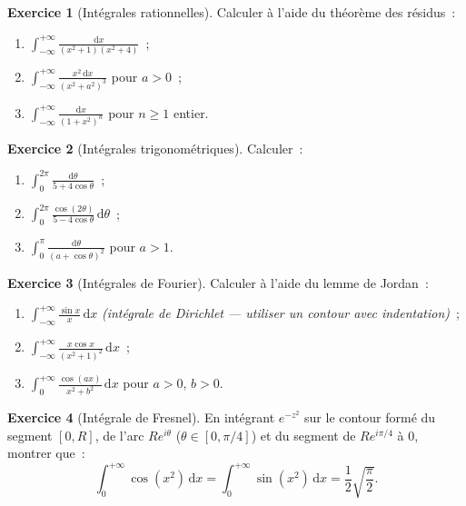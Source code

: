 \documentclass[12pt,a4paper,openany]{book}
\theoremstyle{definition}
\newtheorem{exercice}{Exercice}[chapter]
\theoremstyle{plain}
\theoremstyle{remark}
\newcommand{\dd}{\mathrm{d}}
\begin{document}
\begin{exercice}[Intégrales rationnelles]\label{exo:int-rationnelles}
Calculer à l'aide du théorème des résidus~:
\begin{enumerate}[label=\alph*)]
  \item $\displaystyle \int_{-\infty}^{+\infty} \frac{\dd x}{(x^2+1)(x^2+4)}$~;
  \item $\displaystyle \int_{-\infty}^{+\infty} \frac{x^2\,\dd x}{(x^2+a^2)^3}$
    pour $a > 0$~;
  \item $\displaystyle \int_{-\infty}^{+\infty} \frac{\dd x}{(1+x^2)^n}$
    pour $n \geq 1$ entier.
\end{enumerate}
\end{exercice}

\begin{exercice}[Intégrales trigonométriques]\label{exo:int-trig}
Calculer~:
\begin{enumerate}[label=\alph*)]
  \item $\displaystyle \int_0^{2\pi} \frac{\dd\theta}{5 + 4\cos\theta}$~;
  \item $\displaystyle \int_0^{2\pi} \frac{\cos(2\theta)}{5 - 4\cos\theta}\, \dd\theta$~;
  \item $\displaystyle \int_0^{\pi} \frac{\dd\theta}{(a + \cos\theta)^2}$ pour $a > 1$.
\end{enumerate}
\end{exercice}

\begin{exercice}[Intégrales de Fourier]\label{exo:int-fourier}
Calculer à l'aide du lemme de Jordan~:
\begin{enumerate}[label=\alph*)]
  \item $\displaystyle \int_{-\infty}^{+\infty} \frac{\sin x}{x}\, \dd x$
    \emph{(intégrale de Dirichlet --- utiliser un contour avec indentation)}~;
  \item $\displaystyle \int_{-\infty}^{+\infty} \frac{x\cos x}{(x^2+1)^2}\, \dd x$~;
  \item $\displaystyle \int_0^{+\infty} \frac{\cos(ax)}{x^2+b^2}\, \dd x$
    pour $a > 0$, $b > 0$.
\end{enumerate}
\end{exercice}

\begin{exercice}[Intégrale de Fresnel]\label{exo:fresnel}
En intégrant $e^{-z^2}$ sur le contour formé du segment $[0, R]$, de l'arc
$Re^{i\theta}$ ($\theta \in [0, \pi/4]$) et du segment de $Re^{i\pi/4}$ à $0$,
montrer que~:
\[
  \int_0^{+\infty} \cos(x^2)\,\dd x = \int_0^{+\infty} \sin(x^2)\,\dd x
  = \frac{1}{2}\sqrt{\frac{\pi}{2}}.
\]
\end{exercice}
\end{document}
